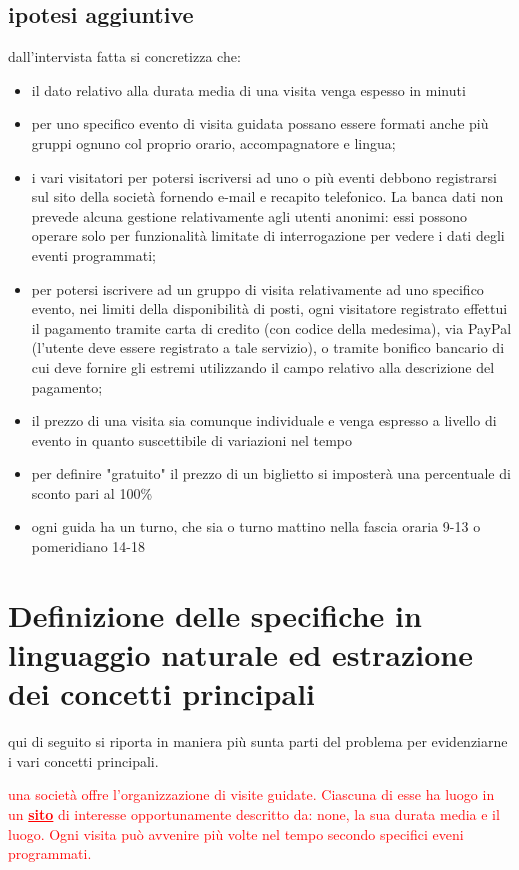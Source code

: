 \documentclass[a4paper,12pt]{report}
\begin{document}
\subsection*{ipotesi aggiuntive}
dall'intervista fatta si concretizza che:
\begin{itemize}
	\item il dato relativo alla durata media di una visita venga espesso in minuti
	\item  per	uno	specifico	evento	di	visita	guidata	possano	essere	formati	anche	più	gruppi		ognuno
	      col	proprio	orario,	accompagnatore	e	lingua;
	\item i	 vari	 visitatori	 per	 potersi	 iscriversi	 ad	 uno	 o	 più	 eventi	 debbono	 registrarsi	 sul	 sito	 della
	      società	 fornendo	 e-mail	 e	 recapito	 telefonico.	 La	 banca	 dati	 non	 prevede	 alcuna	 gestione
	      relativamente	 agli	 utenti	 anonimi:	 essi	 possono	 operare	 solo	 per	 funzionalità	 limitate	 di
	      interrogazione	per	vedere	i	dati	degli	eventi	programmati;
	\item per	potersi	iscrivere	ad	un	gruppo	di	visita	relativamente	ad	uno	specifico	evento,	nei	limiti
	      della	 disponibilità	 di	 posti,	 ogni	 visitatore	 registrato	 effettui	 il	 pagamento	 tramite	 carta	 di
	      credito	 (con	 codice	 della	 medesima),	 via	 PayPal	 (l’utente	 deve	 essere	 registrato	 a	 tale
	      servizio),	 o	 tramite	 bonifico	 bancario	 di	 cui	 deve	 fornire	 gli	 estremi	 utilizzando	 il	 campo
	      relativo	alla	descrizione	del	pagamento;
	\item il	prezzo	di	una	visita	sia	comunque	individuale	e	venga	espresso	a	livello	di	evento	in	quanto
	      suscettibile	di	variazioni	nel	tempo
	\item per definire "gratuito" il prezzo di un biglietto si imposterà una percentuale di sconto pari al 100\%
	\item ogni guida ha un turno, che sia o turno mattino nella fascia oraria 9-13 o pomeridiano 14-18
\end{itemize}



\section{Definizione delle specifiche in linguaggio naturale ed estrazione dei concetti principali}
qui di seguito si riporta in maniera più sunta parti del problema per evidenziarne i vari concetti principali.

\textcolor{red}{una società offre l'organizzazione di visite guidate. Ciascuna di esse ha luogo
	in un \textbf{\underline{sito}}
	di interesse opportunamente descritto da: none, la sua durata media e il luogo.
	Ogni visita può avvenire più volte nel tempo secondo specifici eveni programmati.
}
\end{document}
